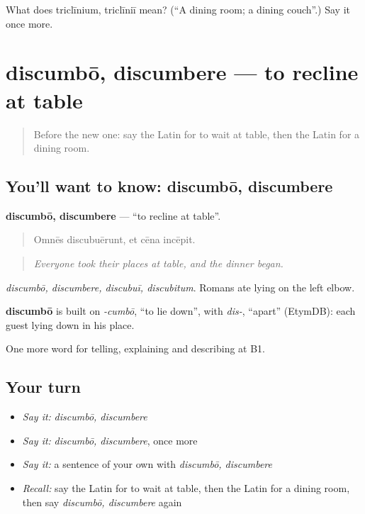 \begin{tcolorbox}[breakable,colback=teal!4,colframe=teal!35!black,title={Before you move on}]
What does triclīnium, triclīniī mean? (\textquotedblleft{}A dining room; a dining couch\textquotedblright{}.) Say it once more.
\end{tcolorbox}
\section[discumbō, discumbere]{discumbō, discumbere — to recline at table}

\label{lesson:LA-C356-discumbo}



\begin{quote}
Before the new one: say the Latin for to wait at table, then the Latin for a dining room.
\end{quote}

\subsection*{You'll want to know: discumbō, discumbere}
\textbf{discumbō, discumbere} — \textquotedblleft{}to recline at table\textquotedblright{}.

\begin{quote}
Omnēs discubuērunt, et cēna incēpit.
\end{quote}

\begin{quote}
\emph{Everyone took their places at table, and the dinner began.}
\end{quote}

\emph{discumbō, discumbere, discubuī, discubitum}. Romans ate lying on the left elbow.

\begin{cousinweb}
\textbf{discumbō} is built on \emph{-cumbō}, \textquotedblleft{}to lie down\textquotedblright{}, with \emph{dis-}, \textquotedblleft{}apart\textquotedblright{} (EtymDB): each guest lying down in his place.
\end{cousinweb}

\begin{grammarlens}[title={What you've built}]
One more word for telling, explaining and describing at B1.
\end{grammarlens}

\subsection*{Your turn}
\begin{itemize}
\raggedright
  \item \emph{Say it:} \emph{discumbō, discumbere}
  \item \emph{Say it:} \emph{discumbō, discumbere}, once more
  \item \emph{Say it:} a sentence of your own with \emph{discumbō, discumbere}
  \item \emph{Recall:} say the Latin for to wait at table, then the Latin for a dining room, then say \emph{discumbō, discumbere} again
\end{itemize}

